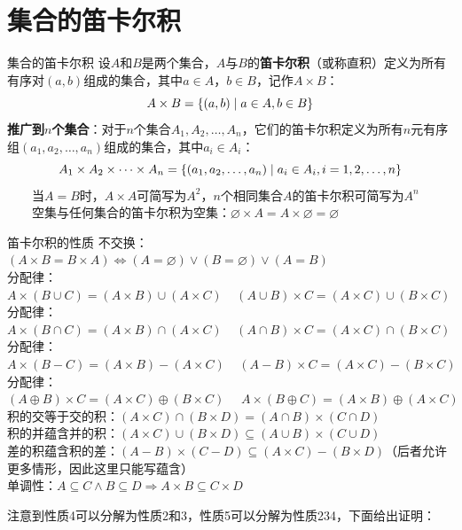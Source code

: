 \section{集合的笛卡尔积}
\begin{definition}{集合的笛卡尔积}{}
设$A$和$B$是两个集合，$A$与$B$的\textbf{笛卡尔积}（或称直积）定义为所有有序对$(a,b)$组成的集合，其中$a \in A$，$b \in B$，记作$A \times B$：\vspace{-10pt}
$$A \times B = \{(a,b) \mid a \in A, b \in B\}\vspace{-10pt}$$
\textbf{推广到$n$个集合}：对于$n$个集合$A_1, A_2, \ldots, A_n$，它们的笛卡尔积定义为所有$n$元有序组$(a_1, a_2, \ldots, a_n)$组成的集合，其中$a_i \in A_i$：
\vspace{-10pt}$$A_1 \times A_2 \times \cdots \times A_n = \{(a_1, a_2, \ldots, a_n) \mid a_i \in A_i, i = 1,2,\ldots,n\}\vspace{-10pt}$$
~~~~当$A = B$时，$A \times A$可简写为$A^2$，$n$个相同集合$A$的笛卡尔积可简写为$A^n$\\
~~~~空集与任何集合的笛卡尔积为空集：$\varnothing \times A = A \times \varnothing = \varnothing$
\end{definition}
\begin{theorem}{笛卡尔积的性质}{}
不交换：$(A\times B=B\times A)\Leftrightarrow (A=\varnothing)\lor(B=\varnothing)\lor(A=B)$\\
分配律：$A\times(B\cup C)=(A\times B)\cup(A\times C)~~~~~(A\cup B)\times C=(A\times C)\cup(B\times C)$\\
分配律：$A\times(B\cap C)=(A\times B)\cap(A\times C)~~~~~(A\cap B)\times C=(A\times C)\cap(B\times C)$\\
分配律：$A\times(B-C)=(A\times B)-(A\times C)~~~~~(A-B)\times C=(A\times C)-(B\times C)$\\
分配律：$(A\oplus B)\times C=(A\times C)\oplus(B\times C)~~~~~~A\times(B\oplus C)=(A\times B)\oplus(A\times C)$\\
积的交等于交的积：$(A\times C)\cap(B\times D)=(A\cap B)\times(C\cap D)$\\
积的并蕴含并的积：$(A\times C)\cup(B\times D)\subseteq(A\cup B)\times(C\cup D)$\\
差的积蕴含积的差：$(A-B)\times(C-D)\subseteq (A\times C)-(B\times D)$（后者允许更多情形，因此这里只能写蕴含）\\
单调性：$A\subseteq C\land B\subseteq D\Rightarrow A\times B\subseteq C\times D$
\end{theorem}
注意到性质4可以分解为性质2和3，性质5可以分解为性质234，下面给出证明：\vspace{-10pt}
